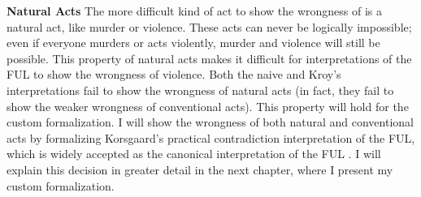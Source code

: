 \begin{isabellebody}
\begin{isamarkuptext}
\medskip 

\textbf{Natural Acts}
The more difficult kind of act to show the wrongness of is a natural act, like murder or violence. 
These acts can never be logically impossible; even if everyone murders or acts violently, murder and 
violence will still be possible. This property of natural acts makes it difficult for interpretations of
the FUL to show the wrongness of violence. Both the naive and Kroy's interpretations fail to show
the wrongness of natural acts (in fact, they fail to show the weaker wrongness of conventional acts). 
This property will hold for the custom formalization. I will show the wrongness of both natural and 
conventional acts by formalizing Korsgaard's practical contradiction interpretation of the FUL, which 
is widely accepted as the canonical interpretation of the FUL \citep{KorsgaardFUL}. I will explain this 
decision in greater detail in the next chapter, where I present my custom formalization.%
\end{isamarkuptext}\isamarkuptrue%
%
\isadelimtheory
%
\endisadelimtheory
%
\isatagtheory
%
\endisatagtheory
{\isafoldtheory}%
%
\isadelimtheory
%
\endisadelimtheory
%
\end{isabellebody}%
\endinput

